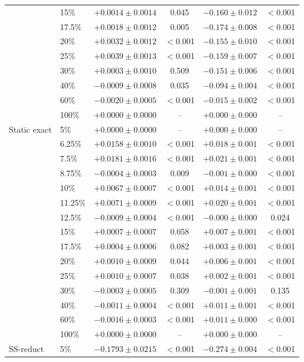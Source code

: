 \begin{tabular}{llcccc}
 & 15\% & $+0.0014\pm0.0014$ & 0.045 & $-0.160\pm0.012$ & $<$0.001 \\
 & 17.5\% & $+0.0018\pm0.0012$ & 0.005 & $-0.174\pm0.008$ & $<$0.001 \\
 & 20\% & $+0.0032\pm0.0012$ & $<$0.001 & $-0.155\pm0.010$ & $<$0.001 \\
 & 25\% & $+0.0039\pm0.0013$ & $<$0.001 & $-0.159\pm0.007$ & $<$0.001 \\
 & 30\% & $+0.0003\pm0.0010$ & 0.509 & $-0.151\pm0.006$ & $<$0.001 \\
 & 40\% & $-0.0009\pm0.0008$ & 0.035 & $-0.094\pm0.004$ & $<$0.001 \\
 & 60\% & $-0.0020\pm0.0005$ & $<$0.001 & $-0.015\pm0.002$ & $<$0.001 \\
 & 100\% & $+0.0000\pm0.0000$ & -- & $+0.000\pm0.000$ & -- \\
\midrule
Static exact & 5\% & $+0.0000\pm0.0000$ & -- & $+0.000\pm0.000$ & -- \\
 & 6.25\% & $+0.0158\pm0.0010$ & $<$0.001 & $+0.018\pm0.001$ & $<$0.001 \\
 & 7.5\% & $+0.0181\pm0.0016$ & $<$0.001 & $+0.021\pm0.001$ & $<$0.001 \\
 & 8.75\% & $-0.0004\pm0.0003$ & 0.009 & $-0.001\pm0.000$ & $<$0.001 \\
 & 10\% & $+0.0067\pm0.0007$ & $<$0.001 & $+0.014\pm0.001$ & $<$0.001 \\
 & 11.25\% & $+0.0071\pm0.0009$ & $<$0.001 & $+0.020\pm0.001$ & $<$0.001 \\
 & 12.5\% & $-0.0009\pm0.0004$ & $<$0.001 & $-0.000\pm0.000$ & 0.024 \\
 & 15\% & $+0.0007\pm0.0007$ & 0.058 & $+0.007\pm0.001$ & $<$0.001 \\
 & 17.5\% & $+0.0004\pm0.0006$ & 0.082 & $+0.003\pm0.001$ & $<$0.001 \\
 & 20\% & $+0.0010\pm0.0009$ & 0.044 & $+0.006\pm0.001$ & $<$0.001 \\
 & 25\% & $+0.0010\pm0.0007$ & 0.038 & $+0.002\pm0.001$ & $<$0.001 \\
 & 30\% & $-0.0003\pm0.0005$ & 0.309 & $-0.001\pm0.001$ & 0.135 \\
 & 40\% & $-0.0011\pm0.0004$ & $<$0.001 & $+0.011\pm0.001$ & $<$0.001 \\
 & 60\% & $-0.0016\pm0.0003$ & $<$0.001 & $+0.011\pm0.000$ & $<$0.001 \\
 & 100\% & $+0.0000\pm0.0000$ & -- & $+0.000\pm0.000$ & -- \\
\midrule
SS-reduct & 5\% & $-0.1793\pm0.0215$ & $<$0.001 & $-0.274\pm0.004$ & $<$0.001 \\

\end{tabular}
